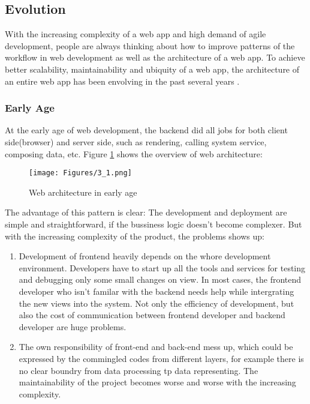 

\subsection{Evolution}
With the increasing complexity of a web app and high demand of agile development, people are always thinking about how to improve patterns of the workflow in web development as well as the architecture of a web app. To achieve better scalability, maintainability and ubiquity of a web app, the architecture of an entire web app has been envolving in the past several years .

\subsubsection{Early Age}
At the early age of web development, the backend did all jobs for both client side(browser) and server side, such as rendering, calling system service, composing data, etc. Figure \ref{fig:3.1} shows the overview of web architecture:
\begin{figure}[!htbp]
  \caption{Web architecture in early age}
  \centering
    \texttt{[image: Figures/3\_1.png]}
  \label{fig:3.1}
\end{figure}
The advantage of this pattern is clear: The development and deployment are simple and straightforward, if the bussiness logic doesn't become complexer. But with the increasing complexity of the product, the problems shows up:
\begin{enumerate}
\item
Development of frontend heavily depends on the whore development environment. Developers have to start up all the tools and services for testing and debugging only some small changes on view. In most cases, the frontend developer who isn't familar with the backend needs help while intergrating the new views into the system. Not only the efficiency of development, but also the cost of communication between frontend developer and backend developer are huge problems.
\item
The own responsibility of front-end and back-end mess up, which could be expressed by the commingled codes from different layers, for example there is no clear boundry from data processing tp data representing. The maintainability of the project becomes worse and worse with the increasing complexity.
\end{enumerate}


